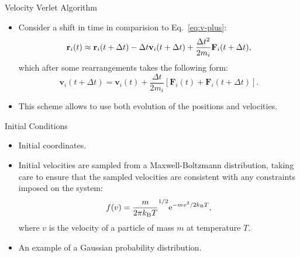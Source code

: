 \documentclass[10pt]{beamer}
\begin{document}
\begin{frame}{Velocity Verlet Algorithm}
\begin{itemize}
\setlength\itemsep{1em}
  \item Consider a shift in time in comparision to Eq.~\ref{eq:v-plus}:
  \begin{equation}
    {\bf r}_i(t) \approx {\bf r}_i(t+\Delta t) - \Delta t \mathbf{v}_i(t+\Delta t) + \frac{\Delta t^2}{2m_i}\mathbf{F}_i(t+\Delta t),
  \end{equation}
  which after some rearrangements takes the following form:
  \begin{equation}
    \mathbf{v}_i(t+\Delta t) = \mathbf{v}_i(t) + \frac{\Delta t}{2m_i}\left[ \mathbf{F}_i(t) + \mathbf{F}_i(t+\Delta t) \right].
  \end{equation}

  \item This scheme allows to use both evolution of the positions and velocities.
\end{itemize}
\end{frame}

\begin{frame}{Initial Conditions}
\begin{itemize}
\setlength\itemsep{1em}
  \item Initial coordinates.

  \item Initial velocities are sampled from a Maxwell-Boltzmann distribution, taking care to ensure that the sampled velocities are consistent with any constraints imposed on the system:
  \begin{equation}
    f(v) = \frac{m}{2\pi k_\mathrm{B}T}^{1/2} \mathrm{e}^{-mv^2 / 2 k_\mathrm{B}T},
  \end{equation}
  where $v$ is the velocity of a particle of mass $m$ at temperature $T$.

  \item An example of a Gaussian probability distribution.
\end{itemize}
\end{frame}
\end{document}
